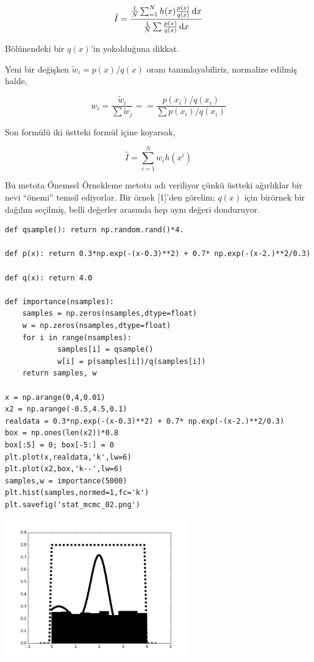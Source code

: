 \documentclass[12pt,fleqn]{article}\usepackage{../../common}
\begin{document}
$$ \hat{I} = \frac
{\frac{1}{N}\sum_{=1}^{N} h(x) \frac{p(x)}{q(x)} \,\mathrm{d} x}
{\frac{1}{N}\sum \frac{p(x)}{q(x)} \,\mathrm{d} x}
$$

Bölünendeki bir $q(x)$'in yokolduğuna dikkat.

Yeni bir değişken $\tilde{w}_i = p(x)/q(x)$ oranı tanımlayabiliriz, normalize
edilmiş halde,

$$ w_i = \frac{\tilde{w}_i}{\sum \tilde{w}_j} =
= \frac{p(x_i)/q(x_i)}{\sum p(x_i)/q(x_i)}
$$

Son formülü iki üstteki formül içine koyarsak,

$$ \hat{I} = \sum_{i=1}^{N} w_i h(x^i)$$

Bu metota Önemsel Örnekleme metotu adı veriliyor çünkü üstteki ağırlıklar bir
nevi ``önemi'' temsil ediyorlar.  Bir örnek [1]'den görelim; $q(x)$ için
birörnek bir dağılım seçilmiş, belli değerler arasında hep aynı değeri
donduruyor.

\begin{verbatim}
def qsample(): return np.random.rand()*4.

def p(x): return 0.3*np.exp(-(x-0.3)**2) + 0.7* np.exp(-(x-2.)**2/0.3) 

def q(x): return 4.0

def importance(nsamples):    
    samples = np.zeros(nsamples,dtype=float)
    w = np.zeros(nsamples,dtype=float)    
    for i in range(nsamples):
            samples[i] = qsample()
            w[i] = p(samples[i])/q(samples[i])                
    return samples, w

x = np.arange(0,4,0.01)
x2 = np.arange(-0.5,4.5,0.1)
realdata = 0.3*np.exp(-(x-0.3)**2) + 0.7* np.exp(-(x-2.)**2/0.3) 
box = np.ones(len(x2))*0.8
box[:5] = 0; box[-5:] = 0
plt.plot(x,realdata,'k',lw=6)
plt.plot(x2,box,'k--',lw=6)
samples,w = importance(5000)
plt.hist(samples,normed=1,fc='k')
plt.savefig('stat_mcmc_02.png')
\end{verbatim}

\includegraphics[height=6cm]{stat_mcmc_02.png}
\end{document}
